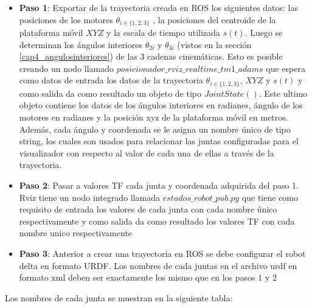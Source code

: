         \begin{itemize}
            \item {\textbf{Paso 1}: Exportar de la trayectoria creada en ROS los siguientes datos: las posiciones de los motores $\theta_{i\in\{1,2,3\}}$ , la posiciones del centroide de la plataforma móvil $XYZ$ y la escala de tiempo utilizada $s(t)$. Luego se determinan los ángulos interiores $\theta_{2i}$ y $\theta_{3i}$ (vistos en la sección \ref{cap4_angulosinteriores}) de las 3 cadenas cinemáticas. Esto es posible creando un nodo llamado $posicionador\_rviz\_realtime\_tm1\_adams$ que espera como datos de entrada los datos de la trayectoria  $\theta_{i\in\{1,2,3\}}$, $XYZ$ y $s(t)$ y como salida da como resultado un objeto de tipo $JointState()$. Este ultimo objeto contiene los datos de los ángulos interiores en radianes, ángulo de los motores en radianes y la posición xyz de la plataforma móvil en metros. Además, cada ángulo y coordenada se le asigna un nombre único de tipo string, los cuales son usados para relacionar las juntas configuradas para el visualizador con respecto al valor de cada una de ellas a través de la trayectoria.}
            \item {\textbf{Paso 2}: Pasar a valores TF cada junta y coordenada adquirida del paso 1. Rviz tiene un nodo integrado llamada $estados\_robot\_pub.py$ que tiene como requisito de entrada los valores de cada junta con cada nombre único respectivamente y como salida da como resultado los valores TF con cada nombre unico respectivamente}
            \item {\textbf{Paso 3}: Anterior a crear una trayectoria en ROS se debe configurar el robot delta en formato URDF. Los nombres de cada juntas en el archivo urdf en formato xml deben ser exactamente los mismo que en los pasos 1 y 2}
        \end{itemize}
        

            Los nombres de cada junta se muestran en la siguiente tabla: 
            
